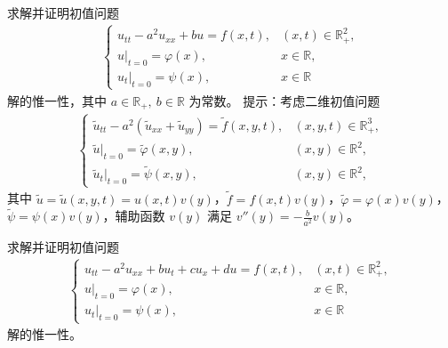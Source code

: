 \documentclass[../../main.tex]{subfiles}%
\begin{document}
\begin{example}
求解并证明初值问题
\begin{align*}
\begin{cases}
u_{tt}-a^2u_{xx}+bu=f(x,t), & (x,t)\in\mathbb{R}_+^2, \\
u|_{t=0}=\varphi(x), & x\in\mathbb{R}, \\
u_t|_{t=0}=\psi(x), & x\in\mathbb{R}
\end{cases}
\end{align*}
解的惟一性，其中 $a\in\mathbb{R}_+,\ b\in\mathbb{R}$ 为常数。
提示：考虑二维初值问题
\begin{align*}
\begin{cases}
\tilde{u}_{tt}-a^2(\tilde{u}_{xx}+\tilde{u}_{yy})=\tilde{f}(x,y,t), & (x,y,t)\in\mathbb{R}_+^3, \\
\tilde{u}|_{t=0}=\tilde{\varphi}(x,y), & (x,y)\in\mathbb{R}^2, \\
\tilde{u}_t|_{t=0}=\tilde{\psi}(x,y), & (x,y)\in\mathbb{R}^2,
\end{cases}
\end{align*}
其中 $\tilde{u}=\tilde{u}(x,y,t)=u(x,t)v(y)$，$\tilde{f}=f(x,t)v(y)$，$\tilde{\varphi}=\varphi(x)v(y)$，$\tilde{\psi}=\psi(x)v(y)$，辅助函数 $v(y)$ 满足 $v''(y)=-\frac{b}{a^2}v(y)$。
\end{example}

\begin{example}
求解并证明初值问题
\begin{align*}
\begin{cases}
u_{tt}-a^2u_{xx}+bu_t+cu_x+du=f(x,t), & (x,t)\in\mathbb{R}_+^2, \\
u|_{t=0}=\varphi(x), & x\in\mathbb{R}, \\
u_t|_{t=0}=\psi(x), & x\in\mathbb{R}
\end{cases}
\end{align*}
解的惟一性。
\end{example}
\end{document}
